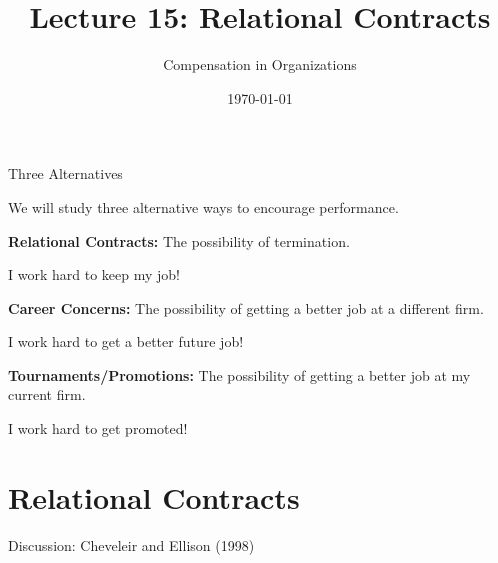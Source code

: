 \documentclass[aspectratio=169,usenames,dvipsnames]{beamer}
\title[diss]{Lecture 15: Relational Contracts} %
\author{Compensation in Organizations} %
\institute[shortinst]{Jacob Kohlhepp}
\date{\today} %
\newenvironment{wideitemize}{\itemize\addtolength{\itemsep}{10pt}}{\enditemize}
\begin{document}
\begin{frame}
\titlepage %

\end{frame}



\begin{frame}{Three Alternatives}

\begin{wideitemize}
    \item We will study three alternative ways to encourage performance.
    \item \textbf{Relational Contracts:} The possibility of termination.
    \begin{wideitemize}
        \item I work hard to keep my job!
    \end{wideitemize}
    \item \textbf{Career Concerns:} The possibility of getting a better job at a different firm.
    \begin{wideitemize}
        \item I work hard to get a better future job!
    \end{wideitemize}
    \item \textbf{Tournaments/Promotions:} The possibility of getting a better job at my current firm.
    \begin{wideitemize}
        \item I work hard to get promoted!
    \end{wideitemize}
\end{wideitemize}
    
\end{frame}

\section{Relational Contracts}


\begin{frame}
\centering
    \huge Discussion: Cheveleir and Ellison (1998)

\end{frame}
\end{document}
